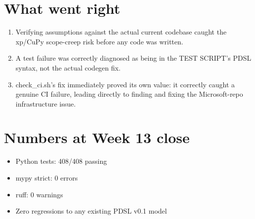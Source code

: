 \documentclass[11pt]{article}
\begin{document}
\section*{What went right}
\begin{enumerate}[leftmargin=*]
  \item Verifying assumptions against the actual current codebase
    caught the xp/CuPy scope-creep risk before any code was written.
  \item A test failure was correctly diagnosed as being in the TEST
    SCRIPT's PDSL syntax, not the actual codegen fix.
  \item check\_ci.sh's fix immediately proved its own value: it
    correctly caught a genuine CI failure, leading directly to
    finding and fixing the Microsoft-repo infrastructure issue.
\end{enumerate}

\section*{Numbers at Week 13 close}
\begin{itemize}[leftmargin=*]
  \item Python tests: 408/408 passing
  \item mypy strict: 0 errors
  \item ruff: 0 warnings
  \item Zero regressions to any existing PDSL v0.1 model
\end{itemize}
\end{document}
